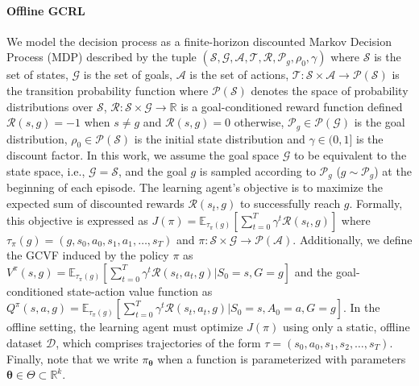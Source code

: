 \documentclass{article}
\theoremstyle{plain}
\theoremstyle{definition}
\theoremstyle{remark}
\begin{document}
\paragraph{Offline GCRL} We model the decision process as a finite-horizon discounted Markov Decision Process (MDP) described by the tuple $(\mathcal{S}, \mathcal{G}, \mathcal{A}, \mathcal{T}, \mathcal{R}, \mathcal{P}_g, \rho_0, \gamma)$ where $\mathcal{S}$ is the set of states, $\mathcal{G}$ is the set of goals, $\mathcal{A}$ is the set of actions, $\mathcal{T}:\mathcal{S} \times \mathcal{A} \to \mathcal{P}(\mathcal{S})$ is the transition probability function where $\mathcal{P}(\mathcal{S})$ denotes the space of probability distributions over $\mathcal{S}$, $\mathcal{R}:\mathcal{S} \times \mathcal{G} \to \mathbb{R}$ is a goal-conditioned reward function defined $\mathcal{R}(s,g)=-1$ when $s\neq g$ and $\mathcal{R}(s,g)=0$ otherwise, $\mathcal{P}_g \in \mathcal{P}(\mathcal{G})$ is the goal distribution, $\rho_0 \in \mathcal{P}(\mathcal{S})$ is the initial state distribution and $\gamma \in (0,1]$ is the discount factor. In this work, we assume the goal space $\mathcal{G}$ to be equivalent to the state space, i.e., $\mathcal{G} = \mathcal{S}$, and the goal $g$ is sampled according to $\mathcal{P}_g$ ($g \sim \mathcal{P}_g$) at the beginning of each episode. The learning agent's objective is to maximize the expected sum of discounted rewards $\mathcal{R}(s_t, g)$ to successfully reach $g$. Formally, this objective is expressed as $J(\pi) = \mathbb{E}_{\tau_{\pi}(g)}[\sum_{t=0}^{T} \gamma^t\mathcal{R}(s_t, g)]$ where $\tau_{\pi}(g) = (g, s_0, a_0, s_1, a_1, \dots, s_T)$ and $\pi: \mathcal{S} \times \mathcal{G} \to \mathcal{P}(\mathcal{A})$. Additionally, we define the GCVF induced by the policy $\pi$ as $V^{\pi}(s, g) = \mathbb{E}_{\tau_{\pi}(g)}[\sum_{t=0}^{T} \gamma^t \mathcal{R}(s_t, a_t, g)|S_0 = s, G = g]$ and the goal-conditioned state-action value function as $Q^{\pi}(s, a, g) = \mathbb{E}_{\tau_{\pi}(g)}[\sum_{t=0}^{T} \gamma^t \mathcal{R}(s_t, a_t, g)|S_0 = s, A_0 = a, G = g]$. In the offline setting, the learning agent must optimize $J(\pi)$ using only a static, offline dataset $\mathcal{D}$, which comprises trajectories of the form $\tau = (s_0, a_0, s_1, s_2, \dots, s_T)$. Finally, note that we write $\pi_{\bm{\theta}}$ when a function is parameterized with parameters $\bm{\theta} \in \varTheta \subset \mathbb{R}^k$.

\vspace{-0.0cm}
\end{document}
